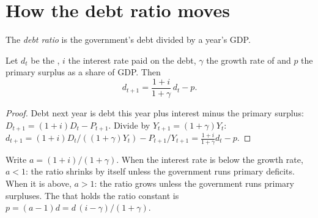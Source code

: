 \section{How the debt ratio moves}\label{sec:g12:fiscal-policy-and-debt:dynamics}

\begin{definition}\label{def:g12:fiscal-policy-and-debt:debt-ratio}
The \emph{debt ratio} is the government's debt divided by a year's GDP.
\end{definition}

\begin{proposition}\label{prop:g12:fiscal-policy-and-debt:recurrence}
Let $d_t$ be the , $i$ the interest rate paid on the debt, $\gamma$ the growth rate of  and $p$ the primary surplus as a share of GDP. Then
\[ d_{t+1} = \frac{1 + i}{1 + \gamma}\, d_t - p. \]
\end{proposition}
\begin{proof}
Debt next year is debt this year plus interest minus the primary surplus: $D_{t+1} = (1 + i) D_t - P_{t+1}$. Divide by $Y_{t+1} = (1 + \gamma) Y_t$:
$d_{t+1} = (1 + i) D_t / ((1 + \gamma) Y_t) - P_{t+1}/Y_{t+1} = \frac{1 + i}{1 + \gamma} d_t - p$.
\end{proof}

Write $a = (1 + i)/(1 + \gamma)$. When the interest rate is below the growth rate, $a < 1$: the ratio shrinks by itself unless the government runs primary deficits. When
it is above, $a > 1$: the ratio grows unless the government runs primary surpluses. The  that holds the ratio constant is $p = (a - 1) d = d\,(i -
\gamma)/(1 + \gamma)$.

